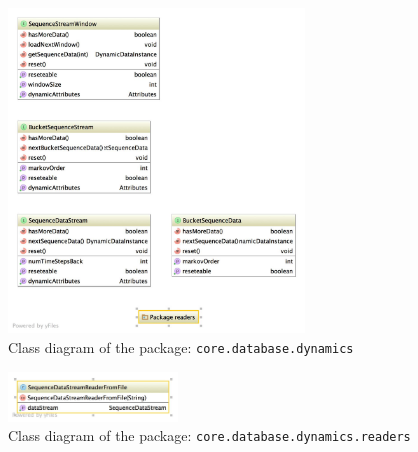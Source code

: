 \begin{figure}[h!]
  \caption{Class diagram of the package: \texttt{core.database.dynamics}}
  \centering
    \includegraphics[width=0.7\textwidth]{ClassDiagrams/core_database_dynamics.jpg}
\end{figure}

\begin{figure}[h!]
  \caption{Class diagram of the package: \texttt{core.database.dynamics.readers}}
  \centering
    \includegraphics[width=0.4\textwidth]{ClassDiagrams/core_database_dynamics_readers.jpg}
\end{figure}

